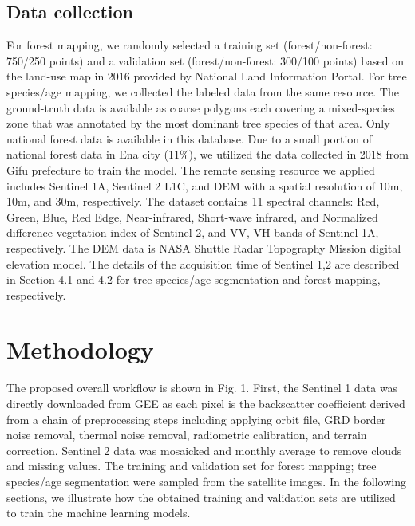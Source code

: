 \subsection{Data collection}
For forest mapping, we randomly selected a training set (forest/non-forest: 750/250 points) and a validation set (forest/non-forest: 300/100 points) based on the land-use map in 2016 provided by National Land Information Portal. For tree species/age mapping, we collected the labeled data from the same resource. The ground-truth data is available as coarse polygons each covering a mixed-species zone that was annotated by the most dominant tree species of that area. Only national forest data is available in this database. Due to a small portion of national forest data in Ena city (11\%), we utilized the data collected in 2018 from Gifu prefecture to train the model. 
The remote sensing resource we applied includes Sentinel 1A, Sentinel 2 L1C, and DEM with a spatial resolution of 10m, 10m, and 30m, respectively. The dataset contains 11 spectral channels: Red, Green, Blue, Red Edge, Near-infrared, Short-wave infrared, and Normalized difference vegetation index of Sentinel 2, and VV, VH bands of Sentinel 1A, respectively. The DEM data is NASA Shuttle Radar Topography Mission digital elevation model. The details of the acquisition time of Sentinel 1,2 are described in Section 4.1 and 4.2 for tree species/age segmentation and forest mapping, respectively. \par

\section{Methodology} \label{chap5_method}
The proposed overall workflow is shown in Fig. 1. First, the Sentinel 1 data was directly downloaded from GEE as each pixel is the backscatter coefficient derived from a chain of preprocessing steps including applying orbit file, GRD border noise removal, thermal noise removal, radiometric calibration, and terrain correction. Sentinel 2 data was mosaicked and monthly average to remove clouds and missing values. The training and validation set for forest mapping; tree species/age segmentation were sampled from the satellite images. In the following sections, we illustrate how the obtained training and validation sets are utilized to train the machine learning models. \par


